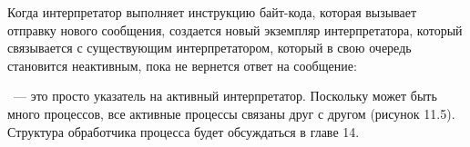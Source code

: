 
Когда интерпретатор выполняет инструкцию байт-кода, которая вызывает отправку
нового сообщения, создается новый экземпляр интерпретатора, который связывается
с существующим интерпретатором, который в свою очередь становится неактивным,
пока не вернется ответ на сообщение:


\ --- это просто указатель на активный интерпретатор. Поскольку
может быть много процессов, все активные процессы связаны друг с другом (рисунок
11.5). Структура обработчика процесса будет обсуждаться в главе 14.

